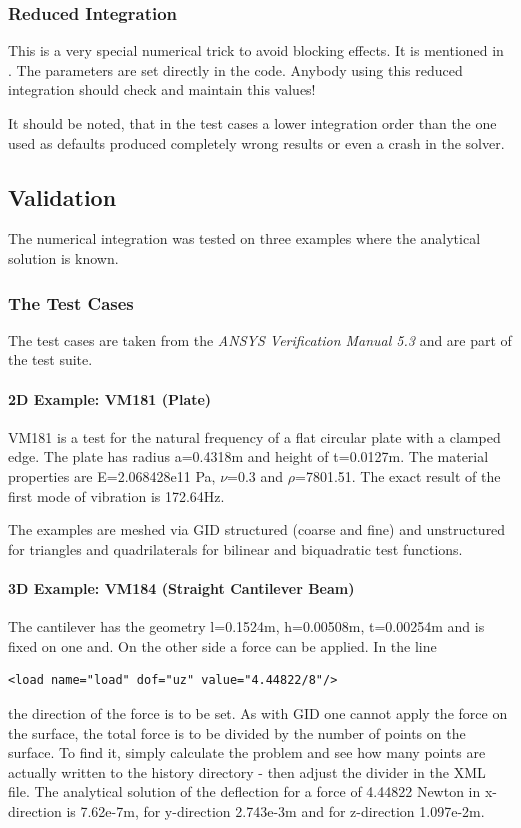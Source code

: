 \subsubsection{Reduced Integration}
This  is a  very special  numerical  trick to  avoid blocking  effects. It  is
mentioned  in  \cite{Hughes00}.  The  parameters   are  set  directly  in  the
code. Anybody  using this reduced  integration should check and  maintain this
values!

It should be noted, that in the  test cases a lower integration order than the
one used as defaults produced completely wrong  results or even a crash in the
solver.

\subsection{Validation}
The numerical  integration was tested  on three examples where  the analytical
solution is known.
\subsubsection{The Test Cases}
\label{sec:test_cases}
The test cases  are taken from the \textit{ANSYS Verification  Manual 5.3} and
are part of the test suite.
\paragraph{2D Example: VM181 (Plate)}
VM181 is  a test for  the natural  frequency of a  flat circular plate  with a
clamped edge.  The plate  has radius  a=0.4318m and  height of  t=0.0127m. The
material properties  are E=2.068428e11  Pa, $\nu$=0.3 and  $\rho$=7801.51. The
exact result of the first mode of vibration is 172.64Hz.

The examples are meshed via GID  structured (coarse and fine) and unstructured
for triangles and quadrilaterals for bilinear and biquadratic test functions.

\paragraph{3D Example: VM184 (Straight Cantilever Beam)}
The cantilever has the geometry l=0.1524m, h=0.00508m, t=0.00254m and is fixed
on one and. On the other side a force can be applied. In the line
\begin{verbatim}
<load name="load" dof="uz" value="4.44822/8"/>
\end{verbatim}
the direction  of the force  is to be  set. As with  GID one cannot  apply the
force on the surface, the total force is to be divided by the number of points
on the  surface. To  find it, simply  calculate the problem  and see  how many
points are actually written to the history directory - then adjust the divider
in the  XML file.  The analytical solution  of the deflection  for a  force of
4.44822 Newton in  x-direction is 7.62e-7m, for y-direction  2.743e-3m and for
z-direction 1.097e-2m.

